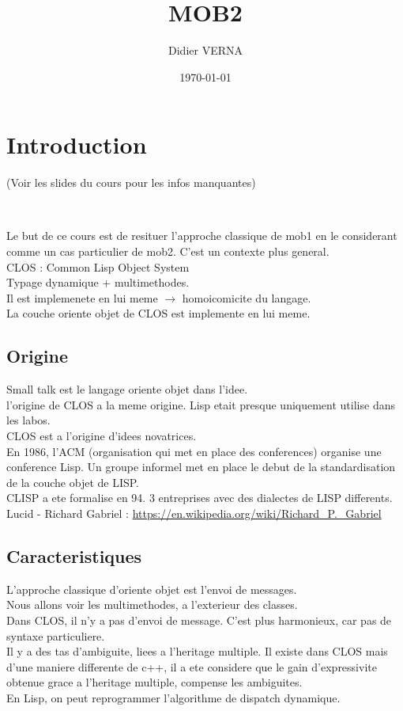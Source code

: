 \documentclass[a4paper,11pt]{article}
\title{MOB2}
\author{Didier VERNA}
\date{\today}
\begin{document}
\maketitle
\tableofcontents



\section{Introduction}
(Voir les slides du cours pour les infos manquantes)

\

Le but de ce cours est de resituer l'approche classique de mob1 en le considerant comme un cas particulier de mob2.
C'est un contexte plus general.\\
CLOS : Common Lisp Object System\\
Typage dynamique + multimethodes.\\
Il est implemenete en lui meme $\rightarrow$ homoicomicite du langage.\\
La couche oriente objet de CLOS est implemente en lui meme.\\


\subsection{Origine}
Small talk est le langage oriente objet dans l'idee.\\
l'origine de CLOS a la meme origine. Lisp etait presque uniquement utilise dans les labos.\\
CLOS est a l'origine d'idees novatrices.\\

En 1986, l'ACM (organisation qui met en place des conferences) organise une conference Lisp. Un groupe informel met en place le debut de la standardisation  de la couche objet de LISP.\\
CLISP a ete formalise en 94. 3 entreprises avec des dialectes de LISP differents.\\
Lucid - Richard Gabriel : \url{https://en.wikipedia.org/wiki/Richard_P._Gabriel}\\
\subsection{Caracteristiques}
L'approche classique d'oriente objet est l'envoi de messages.\\
Nous allons voir les multimethodes, a l'exterieur des classes.\\
Dans CLOS, il n'y a pas d'envoi de message. C'est plus harmonieux, car pas de syntaxe particuliere.\\
Il y a des tas d'ambiguite, liees a l'heritage multiple. Il existe dans CLOS mais d'une maniere differente de c++, il a ete considere que le gain d'expressivite obtenue grace a l'heritage multiple, compense les ambiguites.\\
En Lisp, on peut reprogrammer l'algorithme de dispatch dynamique.\\
\end{document}
